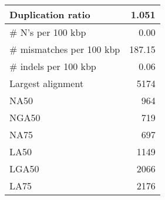 \documentclass[12pt,a4paper]{article}
\begin{document}
\begin{table}[ht]
\begin{center}
\begin{tabular}{|l*{1}{|r}|}
Duplication ratio & 1.051 \\ \hline
\# N's per 100 kbp & 0.00 \\ \hline
\# mismatches per 100 kbp & 187.15 \\ \hline
\# indels per 100 kbp & 0.06 \\ \hline
Largest alignment & 5174 \\ \hline
NA50 & 964 \\ \hline
NGA50 & 719 \\ \hline
NA75 & 697 \\ \hline
LA50 & 1149 \\ \hline
LGA50 & 2066 \\ \hline
LA75 & 2176 \\ \hline
\end{tabular}
\end{center}
\end{table}
\end{document}

